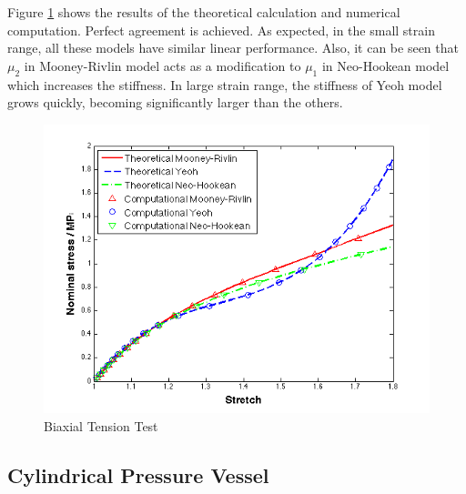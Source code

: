 Figure \ref{fig:biaxial1} shows the results of the theoretical calculation and numerical computation. Perfect agreement is achieved. As expected, in the small strain range, all these models have similar linear performance. Also, it can be seen that $\mu_2$ in Mooney-Rivlin model acts as a modification to $\mu_1$ in Neo-Hookean model which increases the stiffness. In large strain range, the stiffness of Yeoh model grows quickly, becoming significantly larger than the others.
\begin{figure}[h!]
\centering
\includegraphics[width=.6\textwidth]{./figures/biaxial1.png}
\caption{Biaxial Tension Test}
\label{fig:biaxial1}
\end{figure}


\subsection{Cylindrical Pressure Vessel}